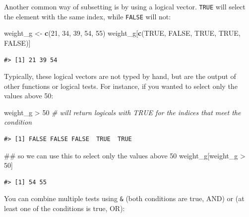\documentclass[]{book}
\newenvironment{Shaded}{\begin{snugshade}}{\end{snugshade}}
\newcommand{\KeywordTok}[1]{\textcolor[rgb]{0.13,0.29,0.53}{\textbf{{#1}}}}
\newcommand{\DecValTok}[1]{\textcolor[rgb]{0.00,0.00,0.81}{{#1}}}
\newcommand{\StringTok}[1]{\textcolor[rgb]{0.31,0.60,0.02}{{#1}}}
\newcommand{\CommentTok}[1]{\textcolor[rgb]{0.56,0.35,0.01}{\textit{{#1}}}}
\newcommand{\OtherTok}[1]{\textcolor[rgb]{0.56,0.35,0.01}{{#1}}}
\newcommand{\NormalTok}[1]{{#1}}
\theoremstyle{definition}
\theoremstyle{definition}
\theoremstyle{remark}
\begin{document}
Another common way of subsetting is by using a logical vector.
\texttt{TRUE} will select the element with the same index, while
\texttt{FALSE} will not:

\begin{Shaded}
\begin{Highlighting}[]
\NormalTok{weight_g <-}\StringTok{ }\KeywordTok{c}\NormalTok{(}\DecValTok{21}\NormalTok{, }\DecValTok{34}\NormalTok{, }\DecValTok{39}\NormalTok{, }\DecValTok{54}\NormalTok{, }\DecValTok{55}\NormalTok{)}
\NormalTok{weight_g[}\KeywordTok{c}\NormalTok{(}\OtherTok{TRUE}\NormalTok{, }\OtherTok{FALSE}\NormalTok{, }\OtherTok{TRUE}\NormalTok{, }\OtherTok{TRUE}\NormalTok{, }\OtherTok{FALSE}\NormalTok{)]}
\end{Highlighting}
\end{Shaded}

\begin{verbatim}
#> [1] 21 39 54
\end{verbatim}

Typically, these logical vectors are not typed by hand, but are the
output of other functions or logical tests. For instance, if you wanted
to select only the values above 50:

\begin{Shaded}
\begin{Highlighting}[]
\NormalTok{weight_g >}\StringTok{ }\DecValTok{50}    \CommentTok{# will return logicals with TRUE for the indices that meet the condition}
\end{Highlighting}
\end{Shaded}

\begin{verbatim}
#> [1] FALSE FALSE FALSE  TRUE  TRUE
\end{verbatim}

\begin{Shaded}
\begin{Highlighting}[]
\NormalTok{## so we can use this to select only the values above 50}
\NormalTok{weight_g[weight_g >}\StringTok{ }\DecValTok{50}\NormalTok{]}
\end{Highlighting}
\end{Shaded}

\begin{verbatim}
#> [1] 54 55
\end{verbatim}

You can combine multiple tests using \texttt{\&} (both conditions are
true, AND) or \texttt{\textbar{}} (at least one of the conditions is
true, OR):
\end{document}
